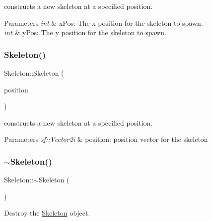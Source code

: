 constructs a new skeleton at a specified position. 


\begin{DoxyParams}{Parameters}
{\em int} & x\+Pos\+: The x position for the skeleton to spawn. \\
\hline
{\em int} & y\+Pos\+: The y position for the skeleton to spawn. \\
\hline
\end{DoxyParams}
\mbox{\label{classSkeleton_af8700e3ac47511a9e84f913c1df78495}} 
\subsubsection{\texorpdfstring{Skeleton()}{Skeleton()}\hspace{0.1cm}{\footnotesize\ttfamily [3/3]}}
{\footnotesize\ttfamily Skeleton\+::\+Skeleton (\begin{DoxyParamCaption}\item[{sf\+::\+Vector2i}]{position }\end{DoxyParamCaption})}



constructs a new skeleton at a specified position. 


\begin{DoxyParams}{Parameters}
{\em sf\+::\+Vector2i} & position\+: position vector for the skeleton \\
\hline
\end{DoxyParams}
\mbox{\label{classSkeleton_aeece886a4e2f039128144f94f25efd10}} 
\subsubsection{\texorpdfstring{$\sim$Skeleton()}{~Skeleton()}}
{\footnotesize\ttfamily Skeleton\+::$\sim$\+Skeleton (\begin{DoxyParamCaption}{ }\end{DoxyParamCaption})\hspace{0.3cm}{\ttfamily [virtual]}}



Destroy the \mbox{\hyperlink{classSkeleton}{Skeleton}} object. 



